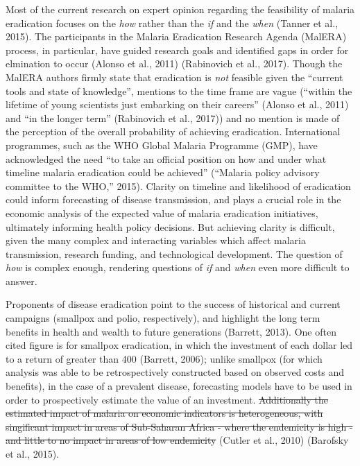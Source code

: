 \documentclass[]{article}
\begin{document}
Most of the current research on expert opinion regarding the feasibility
of malaria eradication focuses on the \emph{how} rather than the
\emph{if} and the \emph{when} (Tanner et al., 2015). The participants in
the Malaria Eradication Research Agenda (MalERA) process, in particular,
have guided research goals and identified gaps in order for elmination
to occur (Alonso et al., 2011) (Rabinovich et al., 2017). Though the
MalERA authors firmly state that eradication is \emph{not} feasible
given the ``current tools and state of knowledge'', mentions to the time
frame are vague (``within the lifetime of young scientists just
embarking on their careers'' (Alonso et al., 2011) and ``in the longer
term'' (Rabinovich et al., 2017)) and no mention is made of the
perception of the overall probability of achieving eradication.
International programmes, such as the WHO Global Malaria Programme
(GMP), have acknowledged the need ``to take an official position on how
and under what timeline malaria eradication could be achieved''
(``Malaria policy advisory committee to the WHO,'' 2015). Clarity on
timeline and likelihood of eradication could inform forecasting of
disease transmission, and plays a crucial role in the economic analysis
of the expected value of malaria eradication initiatives, ultimately
informing health policy decisions. But achieving clarity is difficult,
given the many complex and interacting variables which affect malaria
transmission, research funding, and technological development. The
question of \emph{how} is complex enough, rendering questions of
\emph{if} and \emph{when} even more difficult to answer.

Proponents of disease eradication point to the success of historical and
current campaigns (smallpox and polio, respectively), and highlight the
long term benefits in health and wealth to future generations (Barrett,
2013). One often cited figure is for smallpox eradication, in which the
investment of each dollar led to a return of greater than 400 (Barrett,
2006); unlike smallpox (for which analysis was able to be
retrospectively constructed based on observed costs and benefits), in
the case of a prevalent disease, forecasting models have to be used in
order to prospectively estimate the value of an investment.
\st{Additionally the estimated impact of malaria on economic indicators is heterogeneous, with singificant impact in areas of Sub-Saharan Africa - where the endemicity is high - and little to no impact in areas of low endemicity}
(Cutler et al., 2010) (Barofsky et al., 2015).
\end{document}
